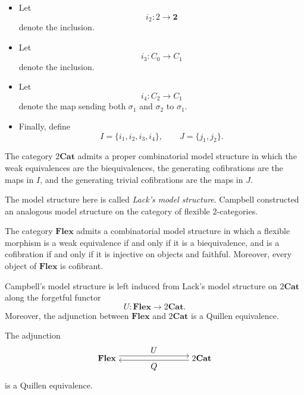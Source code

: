 \documentclass{tac}
\begin{document}
\begin{itemize}
    \item Let
    \[
    i_2:2\longrightarrow\mathbf{2}
    \]
    denote the inclusion.

    \item Let
    \[
    i_3:C_0\longrightarrow C_1
    \]
    denote the inclusion.

    \item Let
    \[
    i_4:C_2\longrightarrow C_1
    \]
    denote the map sending both $\sigma_1$ and $\sigma_2$ to
    $\sigma_1$.

    \item Finally, define
    \[
    I=\{i_1,i_2,i_3,i_4\},
    \qquad
    J=\{j_1,j_2\}.
    \]
\end{itemize}

\begin{theorem}
The category $2\mathbf{Cat}$ admits a proper combinatorial model
structure in which the weak equivalences are the biequivalences, the
generating cofibrations are the maps in $I$, and the generating trivial
cofibrations are the maps in $J$.
\end{theorem}

The model structure here is called \emph{Lack's model structure}. Campbell constructed an analogous model structure on the category of flexible $2$-categories.

\begin{theorem}
The category $\mathbf{Flex}$ admits a combinatorial model structure in
which a flexible morphism is a weak equivalence if and only if it is a
biequivalence, and is a cofibration if and only if it is injective on
objects and faithful. Moreover, every object of $\mathbf{Flex}$ is
cofibrant.
\end{theorem}

Campbell's model structure is left induced from Lack's model structure
on $2\mathbf{Cat}$ along the forgetful functor
\[
U:\mathbf{Flex}\longrightarrow2\mathbf{Cat}.
\]
Moreover, the adjunction between $\mathbf{Flex}$ and $2\mathbf{Cat}$ is
a Quillen equivalence.

\begin{theorem}
The adjunction
\[
\begin{tikzpicture}[node distance=4cm]
\node (A) {$\mathbf{Flex}$};
\node (B) [right of=A] {$2\mathbf{Cat}$};

\draw[transform canvas={yshift=0.6ex},->] (A) -- node[above] {$U$} (B);
\draw[transform canvas={yshift=-0.6ex},<-] (A) -- node[below] {$Q$} (B);
\end{tikzpicture}
\]
is a Quillen equivalence.
\end{theorem}
\end{document}
